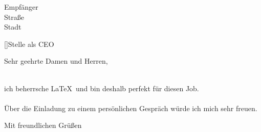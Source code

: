 \documentclass[paper=a4,foldmarks=on,11pt]{scrlttr2}
\begin{document}

\begin{letter}{%
Empfänger\\
Straße\\
Stadt\\}

[]{Stelle als \foreignlanguage{english}{CEO}}

\opening{Sehr geehrte Damen und Herren,}
\ \\
ich beherrsche \LaTeX\ und bin deshalb perfekt für diesen Job.\\
\ \\
Über die Einladung zu einem persönlichen Gespräch würde ich mich sehr freuen.

\closing{Mit freundlichen Grüßen}

\end{letter}
\end{document}
